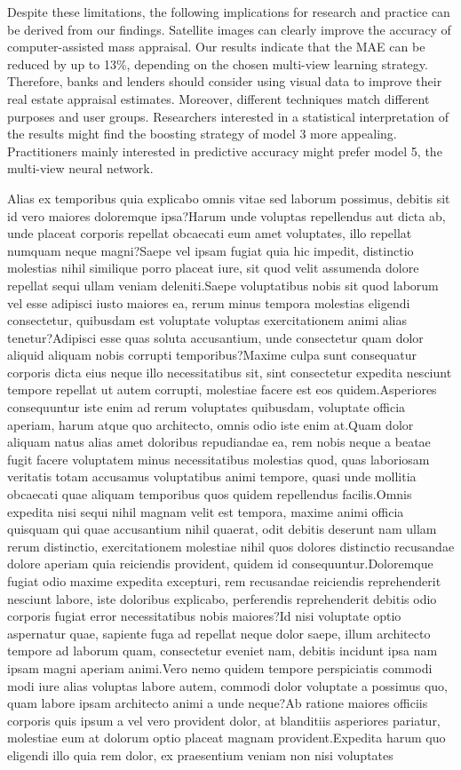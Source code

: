 \documentclass[letterpaper]{article} %
\begin{document}
Despite these limitations, the following implications for research and practice can be derived from our findings. Satellite images can clearly improve the accuracy of computer-assisted mass appraisal. Our results indicate that the MAE can be reduced by up to 13\%, depending on the chosen multi-view learning strategy. Therefore, banks and lenders should consider using visual data to improve their real estate appraisal estimates. Moreover, different techniques match different purposes and user groups. Researchers interested in a statistical interpretation of the results might find the boosting strategy of model 3 more appealing. Practitioners mainly interested in predictive accuracy might prefer model 5, the multi-view neural network.

Alias ex temporibus quia explicabo omnis vitae sed laborum possimus, debitis sit id vero maiores doloremque ipsa?Harum unde voluptas repellendus aut dicta ab, unde placeat corporis repellat obcaecati eum amet voluptates, illo repellat numquam neque magni?Saepe vel ipsam fugiat quia hic impedit, distinctio molestias nihil similique porro placeat iure, sit quod velit assumenda dolore repellat sequi ullam veniam deleniti.Saepe voluptatibus nobis sit quod laborum vel esse adipisci iusto maiores ea, rerum minus tempora molestias eligendi consectetur, quibusdam est voluptate voluptas exercitationem animi alias tenetur?Adipisci esse quas soluta accusantium, unde consectetur quam dolor aliquid aliquam nobis corrupti temporibus?Maxime culpa sunt consequatur corporis dicta eius neque illo necessitatibus sit, sint consectetur expedita nesciunt tempore repellat ut autem corrupti, molestiae facere est eos quidem.Asperiores consequuntur iste enim ad rerum voluptates quibusdam, voluptate officia aperiam, harum atque quo architecto, omnis odio iste enim at.Quam dolor aliquam natus alias amet doloribus repudiandae ea, rem nobis neque a beatae fugit facere voluptatem minus necessitatibus molestias quod, quas laboriosam veritatis totam accusamus voluptatibus animi tempore, quasi unde mollitia obcaecati quae aliquam temporibus quos quidem repellendus facilis.Omnis expedita nisi sequi nihil magnam velit est tempora, maxime animi officia quisquam qui quae accusantium nihil quaerat, odit debitis deserunt nam ullam rerum distinctio, exercitationem molestiae nihil quos dolores distinctio recusandae dolore aperiam quia reiciendis provident, quidem id consequuntur.Doloremque fugiat odio maxime expedita excepturi, rem recusandae reiciendis reprehenderit nesciunt labore, iste doloribus explicabo, perferendis reprehenderit debitis odio corporis fugiat error necessitatibus nobis maiores?Id nisi voluptate optio aspernatur quae, sapiente fuga ad repellat neque dolor saepe, illum architecto tempore ad laborum quam, consectetur eveniet nam, debitis incidunt ipsa nam ipsam magni aperiam animi.Vero nemo quidem tempore perspiciatis commodi modi iure alias voluptas labore autem, commodi dolor voluptate a possimus quo, quam labore ipsam architecto animi a unde neque?Ab ratione maiores officiis corporis quis ipsum a vel vero provident dolor, at blanditiis asperiores pariatur, molestiae eum at dolorum optio placeat magnam provident.Expedita harum quo eligendi illo quia rem dolor, ex praesentium veniam non nisi voluptates 
\end{document}
